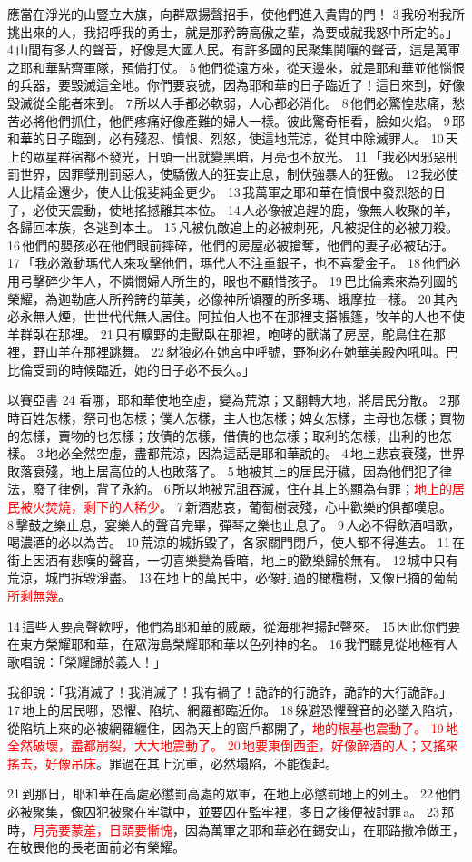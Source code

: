 應當在淨光的山豎立大旗，向群眾揚聲招手，使他們進入貴胄的門！ 3 我吩咐我所挑出來的人，我招呼我的勇士，就是那矜誇高傲之輩，為要成就我怒中所定的。」 4 山間有多人的聲音，好像是大國人民。有許多國的民聚集鬨嚷的聲音，這是萬軍之耶和華點齊軍隊，預備打仗。 5 他們從遠方來，從天邊來，就是耶和華並他惱恨的兵器，要毀滅這全地。你們要哀號，因為耶和華的日子臨近了！這日來到，好像毀滅從全能者來到。 7 所以人手都必軟弱，人心都必消化。 8 他們必驚惶悲痛，愁苦必將他們抓住，他們疼痛好像產難的婦人一樣。彼此驚奇相看，臉如火焰。 9 耶和華的日子臨到，必有殘忍、憤恨、烈怒，使這地荒涼，從其中除滅罪人。 10 天上的眾星群宿都不發光，日頭一出就變黑暗，月亮也不放光。 11 「我必因邪惡刑罰世界，因罪孽刑罰惡人，使驕傲人的狂妄止息，制伏強暴人的狂傲。 12 我必使人比精金還少，使人比俄斐純金更少。 13 我萬軍之耶和華在憤恨中發烈怒的日子，必使天震動，使地搖撼離其本位。 14 人必像被追趕的鹿，像無人收聚的羊，各歸回本族，各逃到本土。 15 凡被仇敵追上的必被刺死，凡被捉住的必被刀殺。 16 他們的嬰孩必在他們眼前摔碎，他們的房屋必被搶奪，他們的妻子必被玷汙。17 「我必激動瑪代人來攻擊他們，瑪代人不注重銀子，也不喜愛金子。 18 他們必用弓擊碎少年人，不憐憫婦人所生的，眼也不顧惜孩子。 19 巴比倫素來為列國的榮耀，為迦勒底人所矜誇的華美，必像神所傾覆的所多瑪、蛾摩拉一樣。 20 其內必永無人煙，世世代代無人居住。阿拉伯人也不在那裡支搭帳篷，牧羊的人也不使羊群臥在那裡。 21 只有曠野的走獸臥在那裡，咆哮的獸滿了房屋，鴕鳥住在那裡，野山羊在那裡跳舞。 22 豺狼必在她宮中呼號，野狗必在她華美殿內吼叫。巴比倫受罰的時候臨近，她的日子必不長久。」

以賽亞書 24
看哪，耶和華使地空虛，變為荒涼；又翻轉大地，將居民分散。 2 那時百姓怎樣，祭司也怎樣；僕人怎樣，主人也怎樣；婢女怎樣，主母也怎樣；買物的怎樣，賣物的也怎樣；放債的怎樣，借債的也怎樣；取利的怎樣，出利的也怎樣。 3 地必全然空虛，盡都荒涼，因為這話是耶和華說的。 4 地上悲哀衰殘，世界敗落衰殘，地上居高位的人也敗落了。 5 地被其上的居民汙穢，因為他們犯了律法，廢了律例，背了永約。 6 所以地被咒詛吞滅，住在其上的顯為有罪；\textcolor{red}{地上的居民被火焚燒，剩下的人稀少}。 7 新酒悲哀，葡萄樹衰殘，心中歡樂的俱都嘆息。 8 擊鼓之樂止息，宴樂人的聲音完畢，彈琴之樂也止息了。 9 人必不得飲酒唱歌，喝濃酒的必以為苦。 10 荒涼的城拆毀了，各家關門閉戶，使人都不得進去。 11 在街上因酒有悲嘆的聲音，一切喜樂變為昏暗，地上的歡樂歸於無有。 12 城中只有荒涼，城門拆毀淨盡。 13 在地上的萬民中，必像打過的橄欖樹，又像已摘的葡萄\textcolor{red}{所剩無幾}。

14 這些人要高聲歡呼，他們為耶和華的威嚴，從海那裡揚起聲來。 15 因此你們要在東方榮耀耶和華，在眾海島榮耀耶和華以色列神的名。 16 我們聽見從地極有人歌唱說：「榮耀歸於義人！」

我卻說：「我消滅了！我消滅了！我有禍了！詭詐的行詭詐，詭詐的大行詭詐。」 17 地上的居民哪，恐懼、陷坑、網羅都臨近你。 18 躲避恐懼聲音的必墜入陷坑，從陷坑上來的必被網羅纏住，因為天上的窗戶都開了，\textcolor{red}{地的根基也震動了。 19 地全然破壞，盡都崩裂，大大地震動了。 20 地要東倒西歪，好像醉酒的人；又搖來搖去，好像吊床}。罪過在其上沉重，必然塌陷，不能復起。


21 到那日，耶和華在高處必懲罰高處的眾軍，在地上必懲罰地上的列王。 22 他們必被聚集，像囚犯被聚在牢獄中，並要囚在監牢裡，多日之後便被討罪 a。 23 那時，\textcolor{red}{月亮要蒙羞，日頭要慚愧}，因為萬軍之耶和華必在錫安山，在耶路撒冷做王，在敬畏他的長老面前必有榮耀。


